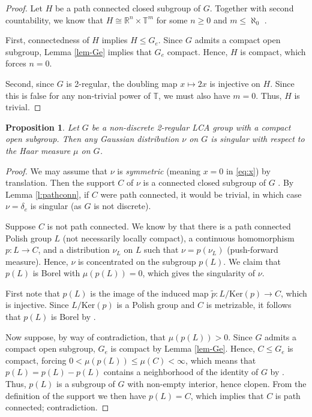 \documentclass[12pt,reqno]{amsart}
\newtheorem{prop}[thm]{Proposition}
\theoremstyle{definition}
\theoremstyle{definition}
\theoremstyle{definition}
\numberwithin{thm}{section}
\numberwithin{equation}{section}
\newcommand{\Real}{\mathbb R}
\newcommand{\bT}{\mathbb{T}}
\begin{document}
\begin{proof} Let $H$ be a path connected closed subgroup of $G$. Together with second countability, we know that $H \cong \Real^n\times\bT^m$ for some $n\geq 0$ and $m\leq\aleph_0$ \cite[8.27]{Armacost}.

First, connectedness of $H$ implies $H\leq G_e$. Since $G$ admits a compact open subgroup, Lemma \ref{lem-Ge} implies that $G_e$ compact. Hence, $H$ is compact, which forces $n=0$.

Second, since $G$ is 2-regular, the doubling map $x\mapsto 2x$ is injective on $H$. Since this is false for any non-trivial power of $\bT$, we must also have $m=0$. Thus, $H$ is trivial.
\end{proof}

\begin{prop}\label{p:singular} Let $G$ be a non-discrete 2-regular LCA group with a compact open subgroup. Then any Gaussian distribution $\nu$ on $G$ is singular with respect to the Haar measure $\mu$ on $G$. 
\end{prop}

\begin{proof} We may assume that $\nu$ is \textit{symmetric} (meaning $x=0$ in \eqref{eq:x}) by translation. Then the support $C$ of $\nu$ is a connected closed subgroup of $G$ \cite[Proposition 3.6]{Feldman}. By Lemma \ref{l:pathconn}, if $C$ were path connected, it would be trivial, in which case $\nu=\delta_{e}$ is singular (as $G$ is not discrete).

Suppose $C$ is not path connected. We know by \cite[Proposition 3.8, Proposition 3.11]{Feldman} that there is a path connected Polish group $L$ (not necessarily locally compact), a continuous homomorphism $p:L\rightarrow C$, and a distribution $\nu_L$ on $L$ such that $\nu=p(\nu_L)$ (push-forward measure). Hence, $\nu$ is concentrated on the subgroup $p(L)$. We claim that $p(L)$ is Borel with $\mu(p(L)) = 0$, which gives the singularity of $\nu$.

First note that $p(L)$ is the image of the induced map $\tilde{p}:L/\mathrm{Ker}(p) \to C$, which is injective. Since $L/\mathrm{Ker}(p)$ is a Polish group and $C$ is metrizable, it follows that $p(L)$ is Borel by \cite[Corollary A.7]{Takesaki}.

Now suppose, by way of contradiction, that $\mu(p(L))>0$. Since $G$ admits a compact open subgroup, $G_e$ is compact by Lemma \ref{lem-Ge}. Hence, $C\leq G_e$ is compact, forcing $0<\mu(p(L))\leq\mu(C)<\infty$, which means that $p(L) = p(L)-p(L)$ contains a neighborhood of the identity of $G$ by \cite[20.17]{HewittRoss}. Thus, $p(L)$ is a subgroup of $G$ with non-empty interior, hence clopen. From the definition of the support we then have $p(L) = C$, which implies that $C$ is path connected; contradiction.
\end{proof}
\end{document}
